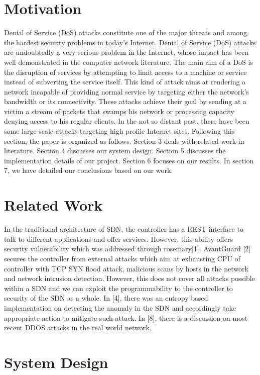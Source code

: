 \documentclass[conference]{IEEEtran}
\begin{document}
\section{\textbf{Motivation}}
Denial of Service (DoS) attacks constitute one of the major threats and among the hardest security problems in today's Internet. Denial of Service (DoS) attacks are undoubtedly a very serious problem in the Internet, whose impact has been well demonstrated in the computer network literature. The main aim of a DoS is the disruption of services by attempting to limit access to a machine or service instead of subverting the service itself. This kind of attack aims at rendering a network incapable of providing normal service by targeting either the network's bandwidth or its connectivity. These attacks achieve their goal by sending at a victim a stream of packets that swamps his network or processing capacity denying access to his regular clients. In the not so distant past, there have been some large-scale attacks targeting high profile Internet sites. Following this section, the paper is organized as follows. Section 3 deals with related work in literature. Section 4 discusses our system design. Section 5 discusses the implementation details of our project. Section 6 focuses on our results. In section 7, we have detailed our conclusions based on our work.  




\section{\textbf{Related Work}}
In the traditional architecture of SDN, the controller has a REST interface to talk to different applications and offer services. However, this ability offers security vulnerability which was addressed through rosemary[1]. AvantGuard [2] secures the controller from external attacks which aim at exhausting CPU of controller with TCP SYN flood attack, malicious scans by hosts in the network and network intrusion detection. However, this does not cover all attacks possible within a SDN and we can exploit the programmability to the controller to security of the SDN as a whole. In [4], there was an entropy based implementation on detecting the anomaly in the SDN and accordingly take appropriate action to mitigate such attack. In [8], there is a discussion on most recent DDOS attacks in the real world network.



\section{\textbf{System Design}}
\end{document}
